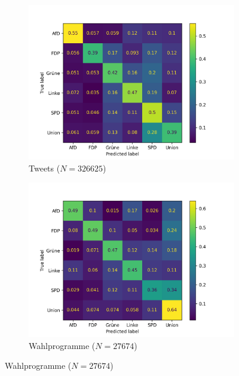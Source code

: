 \begin{figure}[H]
    \centering
    \begin{subfigure}{0.49\textwidth}
        \includegraphics[width=\textwidth]{data/images/modeling/cnn/tweets_confusion_matrix.png}
        \caption{Tweets (\(N=\num{326625}\))}
        \label{sfig:confusionMatrixCnnTweets}
    \end{subfigure}
    \hfill
    \begin{subfigure}{0.49\textwidth}
        \includegraphics[width=\textwidth]{data/images/modeling/cnn/party_programs_confusion_matrix.png}
        \caption{Wahlprogramme (\(N=\num{27674}\))}
        \label{sfig:confusionMatrixCnnManifest}
    \end{subfigure}

\end{figure}
